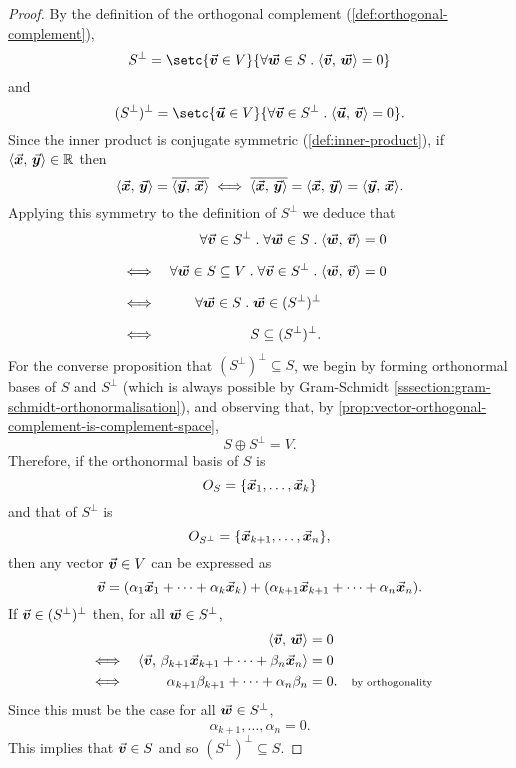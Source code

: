 \documentclass[../MathsNotesBase.tex]{subfiles}
\begin{document}
{		\bigskip
		\begin{proof}
			By the definition of the orthogonal complement (\ref{def:orthogonal-complement}),
			\[ S^\perp = \setc{\v \in V}{\forall \w \in S \logicsep \inner{\v}{\w} = 0} \]
			and
			\[ (S^\perp)^\perp = \setc{\u \in V}{\forall \v \in S^\perp \logicsep \inner{\u}{\v} = 0}. \]
			Since the inner product is conjugate symmetric (\ref{def:inner-product}), if ${ \langle \vec{\bm{x}},\, \vec{\bm{y}} \rangle \in \mathbb{R}^{} }$ then
			\[ \langle \vec{\bm{x}},\, \vec{\bm{y}} \rangle = \overline{\langle \vec{\bm{y}},\, \vec{\bm{x}} \rangle} \iff \overline{\langle \vec{\bm{x}},\, \vec{\bm{y}} \rangle} = \langle \vec{\bm{x}},\, \vec{\bm{y}} \rangle = \langle \vec{\bm{y}},\, \vec{\bm{x}} \rangle. \]
			Applying this symmetry to the definition of $S^\perp$ we deduce that
			\[\begin{aligned}
				&& \forall \v \in S^\perp \logicsep \forall \w \in S \logicsep &\inner{\w}{\v} = 0 \nn
				&\iff & \forall \w \in S \subseteq V \logicsep \forall \v \in S^\perp \logicsep &\inner{\w}{\v} = 0  &\sidecomment{} \nn
				&\iff & \forall \w \in S \logicsep \w \in (S^\perp)^\perp \nn
				&\iff & S \subseteq (S^\perp)^\perp.
			\end{aligned}\]
			For the converse proposition that ${ (S^\perp)^\perp \subseteq S }$, we begin by forming orthonormal bases of $S$ and $S^\perp$ (which is always possible by Gram-Schmidt \ref{sssection:gram-schmidt-orthonormalisation}), and observing that, by \autoref{prop:vector-orthogonal-complement-is-complement-space},
			\[ S \oplus S^\perp = V. \]
			Therefore, if the orthonormal basis of $S$ is 
			\[ O_S = \{ \vec{\bm{x}}_1,\dots,\vec{\bm{x}}_k \} \]
			and that of $S^\perp$ is
			\[ O_{S^\perp} = \{ \vec{\bm{x}}_{k+1},\dots,\vec{\bm{x}}_{n} \}, \]
			then any vector ${ \vec{\bm{v}} \in V }$ can be expressed as
			\[ \vec{\bm{v}} = (\alpha_1 \vec{\bm{x}}_1 + \cdots + \alpha_k \vec{\bm{x}}_k) + (\alpha_{k+1} \vec{\bm{x}}_{k+1} + \cdots + \alpha_n \vec{\bm{x}}_n). \]
			If ${ \vec{\bm{v}} \in (S^\perp)^\perp }$ then, for all ${ \vec{\bm{w}} \in S^\perp }$,
			\[\begin{aligned}
				&& \langle \vec{\bm{v}},\, \vec{\bm{w}} \rangle &= 0 \\
				&\iff & \langle \vec{\bm{v}},\, \beta_{k+1} \vec{\bm{x}}_{k+1} + \cdots + \beta_n \vec{\bm{x}}_n \rangle &= 0 &\text{\scriptsize{}} \\
				&\iff & \alpha_{k+1} \beta_{k+1} + \cdots + \alpha_n \beta_n &= 0. &\text{\scriptsize{by orthogonality}} \\
			\end{aligned}\]
			Since this must be the case for all ${ \vec{\bm{w}} \in S^\perp }$, 
			\[ \alpha_{k+1}, \dots, \alpha_n = 0. \]
			This implies that ${ \vec{\bm{v}} \in S }$ and so ${ (S^\perp)^\perp \subseteq S }$.
		\end{proof}
	

}
\end{document}
